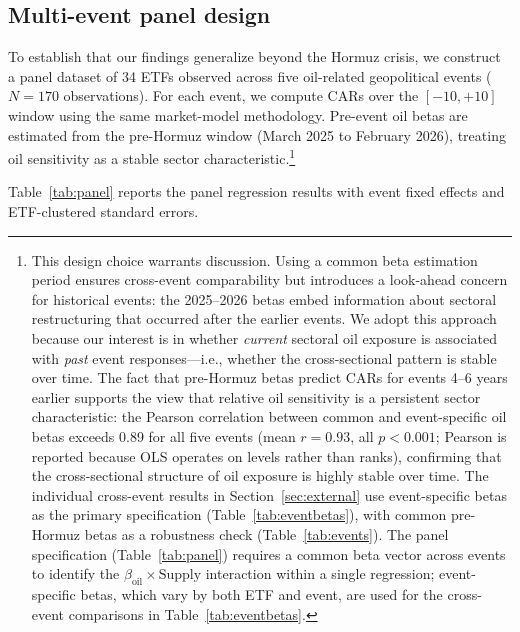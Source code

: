 \documentclass[12pt,preprint,authoryear]{elsarticle}
\begin{document}
\subsection{Multi-event panel design}
To establish that our findings generalize beyond the Hormuz crisis, we construct a panel dataset of 34 ETFs observed across five oil-related geopolitical events ($N = 170$ observations). For each event, we compute CARs over the $[-10, +10]$ window using the same market-model methodology. Pre-event oil betas are estimated from the pre-Hormuz window (March 2025 to February 2026), treating oil sensitivity as a stable sector characteristic.\footnote{This design choice warrants discussion. Using a common beta estimation period ensures cross-event comparability but introduces a look-ahead concern for historical events: the 2025--2026 betas embed information about sectoral restructuring that occurred after the earlier events. We adopt this approach because our interest is in whether \textit{current} sectoral oil exposure is associated with \textit{past} event responses---i.e., whether the cross-sectional pattern is stable over time. The fact that pre-Hormuz betas predict CARs for events 4--6 years earlier supports the view that relative oil sensitivity is a persistent sector characteristic: the Pearson correlation between common and event-specific oil betas exceeds 0.89 for all five events (mean $r = 0.93$, all $p < 0.001$; Pearson is reported because OLS operates on levels rather than ranks), confirming that the cross-sectional structure of oil exposure is highly stable over time. The individual cross-event results in Section~\ref{sec:external} use event-specific betas as the primary specification (Table~\ref{tab:eventbetas}), with common pre-Hormuz betas as a robustness check (Table~\ref{tab:events}). The panel specification (Table~\ref{tab:panel}) requires a common beta vector across events to identify the $\beta_{\text{oil}} \times \text{Supply}$ interaction within a single regression; event-specific betas, which vary by both ETF and event, are used for the cross-event comparisons in Table~\ref{tab:eventbetas}.}

Table~\ref{tab:panel} reports the panel regression results with event fixed effects and ETF-clustered standard errors.
\end{document}
